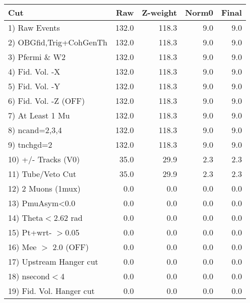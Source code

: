  \begin{table}[h!]\centering
 \begin{tabular}{||l||r|r|r|r||}
 \hline
 \hline
 Cut & Raw & Z-weight & Norm0 & Final \\
 \hline
  1) Raw Events           &       132.0 &       118.3 &         9.0 &         9.0 \\
  2) OBGfid,Trig+CohGenTh &       132.0 &       118.3 &         9.0 &         9.0 \\
  3) Pfermi \& W2         &       132.0 &       118.3 &         9.0 &         9.0 \\
  4) Fid. Vol. -X         &       132.0 &       118.3 &         9.0 &         9.0 \\
  5) Fid. Vol. -Y         &       132.0 &       118.3 &         9.0 &         9.0 \\
  6) Fid. Vol. -Z (OFF)   &       132.0 &       118.3 &         9.0 &         9.0 \\
  7) At Least 1 Mu        &       132.0 &       118.3 &         9.0 &         9.0 \\
  8) ncand=2,3,4          &       132.0 &       118.3 &         9.0 &         9.0 \\
  9) tnchgd=2             &       132.0 &       118.3 &         9.0 &         9.0 \\
 10) +/- Tracks (V0)      &        35.0 &        29.9 &         2.3 &         2.3 \\
 11) Tube/Veto Cut        &        35.0 &        29.9 &         2.3 &         2.3 \\
 12) 2 Muons (1mux)       &         0.0 &         0.0 &         0.0 &         0.0 \\
 13) PmuAsym<0.0          &         0.0 &         0.0 &         0.0 &         0.0 \\
 14) Theta$<$2.62 rad     &         0.0 &         0.0 &         0.0 &         0.0 \\
 15) Pt+wrt- $>$0.05      &         0.0 &         0.0 &         0.0 &         0.0 \\
 16) Mee $>$ 2.0  (OFF)   &         0.0 &         0.0 &         0.0 &         0.0 \\
 17) Upstream Hanger cut  &         0.0 &         0.0 &         0.0 &         0.0 \\
 18) nsecond$<$4          &         0.0 &         0.0 &         0.0 &         0.0 \\
 19) Fid. Vol. Hanger cut &         0.0 &         0.0 &         0.0 &         0.0 \\

\end{tabular}
\end{table}
